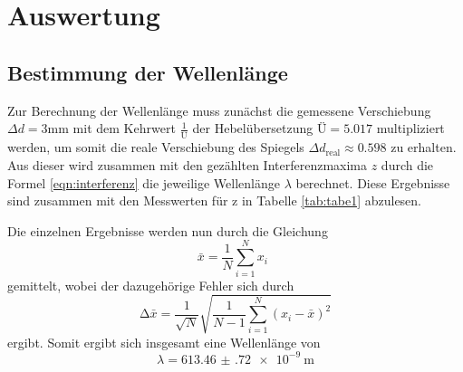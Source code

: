 \section{Auswertung}
\label{sec:Auswertung}
\subsection{Bestimmung der Wellenlänge}
Zur Berechnung der Wellenlänge muss zunächst die gemessene Verschiebung
$\Delta d = 3 \si{\milli\meter}$
mit dem Kehrwert $\frac{1}{\text{Ü}}$ der Hebelübersetzung $\text{Ü}=5.017$ multipliziert werden,
um somit die reale Verschiebung des Spiegels $\Delta d_{\text{real}} \approx 0.598$ zu erhalten.
Aus dieser wird zusammen mit den gezählten Interferenzmaxima $z$ durch die Formel
\ref{eqn:interferenz} die jeweilige Wellenlänge $\lambda$ berechnet. Diese Ergebnisse sind
zusammen mit den Messwerten für z in Tabelle \ref{tab:tabe1} abzulesen.

Die einzelnen Ergebnisse werden nun durch die Gleichung
\begin{equation}
  \bar{x} = \frac{1}{N} \sum_{i=1}^{N} x_i \: \:
  \label{eqn:mit}
\end{equation}
\noindent gemittelt, wobei der dazugehörige Fehler sich durch
\begin{equation}
  \increment \bar{x} = \frac{1}{\sqrt{N}} \sqrt{ \frac{1}{N-1} \sum_{i=1}^N
  (x_i - \bar{x})^2}
  \label{eqn:mitf}
\end{equation}
ergibt.
Somit ergibt sich insgesamt eine Wellenlänge von
\begin{equation*}
  \lambda= \SI{613.46(72)e-9}{\meter}
\end{equation*}
